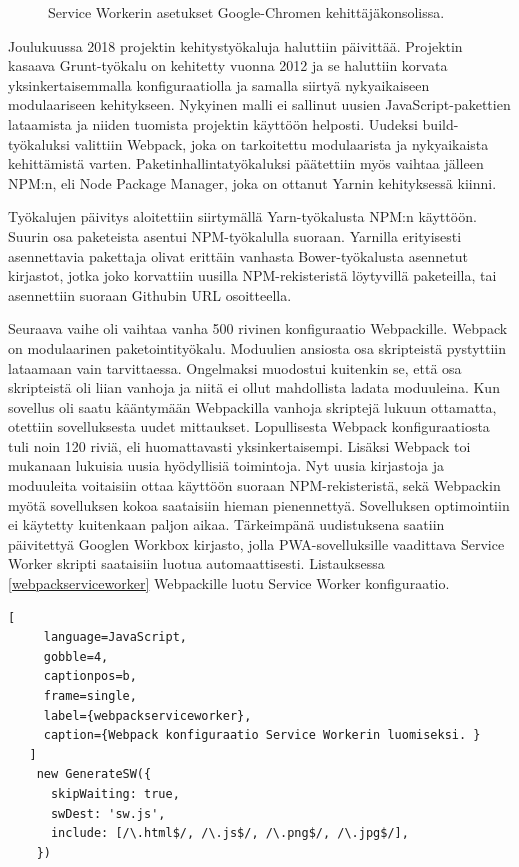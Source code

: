 \documentclass{tktltiki}
\begin{document}
\begin{figure}[h]
\begin{center}
\caption{Service Workerin asetukset Google-Chromen kehittäjäkonsolissa.}
\label{Service Worker}
\end{center}
\end{figure}

Joulukuussa 2018 projektin kehitystyökaluja haluttiin päivittää. Projektin kasaava Grunt-työkalu on kehitetty vuonna 2012 ja se haluttiin korvata yksinkertaisemmalla konfiguraatiolla ja samalla siirtyä nykyaikaiseen modulaariseen kehitykseen. Nykyinen malli ei sallinut uusien JavaScript-pakettien lataamista ja niiden tuomista projektin käyttöön helposti. Uudeksi build-työkaluksi valittiin Webpack, joka on tarkoitettu modulaarista ja nykyaikaista kehittämistä varten. Paketinhallintatyökaluksi päätettiin myös vaihtaa jälleen NPM:n, eli Node Package Manager, joka on ottanut Yarnin kehityksessä kiinni. 

Työkalujen päivitys aloitettiin siirtymällä Yarn-työkalusta NPM:n käyttöön. Suurin osa paketeista asentui NPM-työkalulla suoraan. Yarnilla erityisesti asennettavia pakettaja olivat erittäin vanhasta Bower-työkalusta asennetut kirjastot, jotka joko korvattiin uusilla NPM-rekisteristä löytyvillä paketeilla, tai asennettiin suoraan Githubin URL osoitteella. 

Seuraava vaihe oli vaihtaa vanha 500 rivinen konfiguraatio Webpackille. Webpack on modulaarinen paketointityökalu. Moduulien ansiosta osa skripteistä pystyttiin lataamaan vain tarvittaessa. Ongelmaksi muodostui kuitenkin se, että osa skripteistä oli liian vanhoja ja niitä ei ollut mahdollista ladata moduuleina. Kun sovellus oli saatu kääntymään Webpackilla vanhoja skriptejä lukuun ottamatta, otettiin sovelluksesta uudet mittaukset. Lopullisesta Webpack konfiguraatiosta tuli noin 120 riviä, eli huomattavasti yksinkertaisempi. Lisäksi Webpack toi mukanaan lukuisia uusia hyödyllisiä toimintoja. Nyt uusia kirjastoja ja moduuleita voitaisiin ottaa käyttöön suoraan NPM-rekisteristä, sekä Webpackin myötä sovelluksen kokoa saataisiin hieman pienennettyä. Sovelluksen optimointiin ei käytetty kuitenkaan paljon aikaa. Tärkeimpänä uudistuksena saatiin päivitettyä Googlen Workbox kirjasto, jolla PWA-sovelluksille vaadittava Service Worker skripti saataisiin luotua automaattisesti. Listauksessa \ref{webpackserviceworker} Webpackille luotu Service Worker konfiguraatio.

\begin{lstlisting}[
     language=JavaScript,
     gobble=4,
     captionpos=b,
     frame=single,
     label={webpackserviceworker},
     caption={Webpack konfiguraatio Service Workerin luomiseksi. }
   ]
    new GenerateSW({
      skipWaiting: true,
      swDest: 'sw.js',
      include: [/\.html$/, /\.js$/, /\.png$/, /\.jpg$/],
    })
\end{lstlisting}
\end{document}
